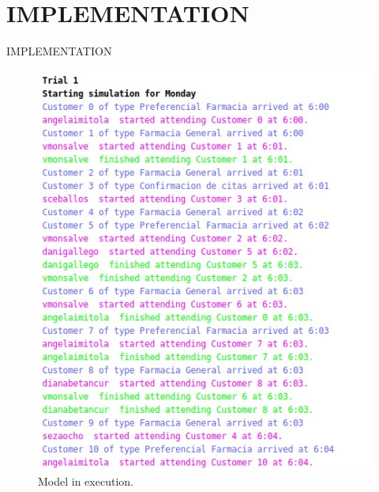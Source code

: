 \section{IMPLEMENTATION}
\begin{frame}{IMPLEMENTATION}
    \begin{figure}
        \centering
        \includegraphics[scale=0.35]{images/model.jpeg}
        \caption{Model in execution.}
    \end{figure}
\end{frame}

